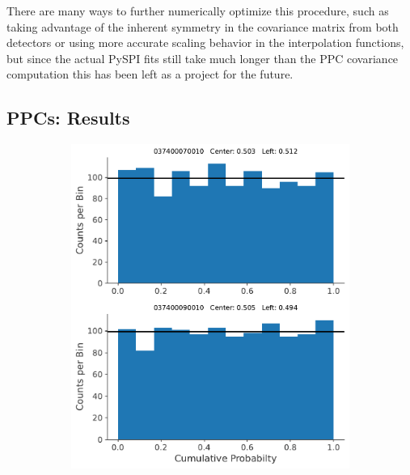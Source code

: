 \documentclass{report}
\begin{document}
There are many ways to further numerically optimize this procedure, such as taking advantage of the inherent symmetry in the covariance matrix from both detectors or using more accurate scaling behavior in the interpolation functions, but since the actual PySPI fits still take much longer than the PPC covariance computation this has been left as a project for the future.


\subsection{PPCs: Results}

\begin{figure}[h]
  \centering
  \begin{subfigure}{0.5\textwidth}
    \centering
    \includegraphics[width=0.9\linewidth]{Images/PPC_and_Background_Analysis/037400070010_037400090010_cdf.pdf}
  \end{subfigure}%
  \begin{subfigure}{.5\textwidth}
    \centering

\end{subfigure}
\end{figure}
\end{document}
